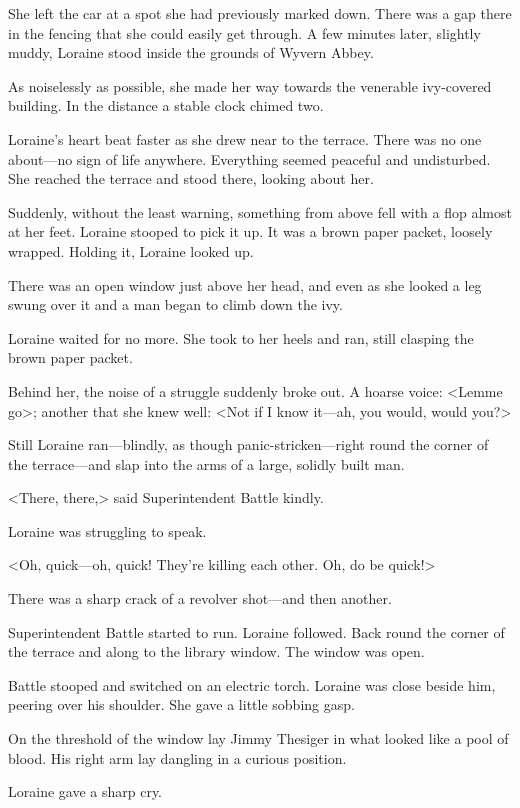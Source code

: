 She left the car at a spot she had previously marked down. There was a gap there in the fencing that she could easily get through. A few minutes later, slightly muddy, Loraine stood inside the grounds of Wyvern Abbey.

As noiselessly as possible, she made her way towards the venerable ivy-covered building. In the distance a stable clock chimed two.

Loraine's heart beat faster as she drew near to the terrace. There was no one about—no sign of life anywhere. Everything seemed peaceful and undisturbed. She reached the terrace and stood there, looking about her.

Suddenly, without the least warning, something from above fell with a flop almost at her feet. Loraine stooped to pick it up. It was a brown paper packet, loosely wrapped. Holding it, Loraine looked up.

There was an open window just above her head, and even as she looked a leg swung over it and a man began to climb down the ivy.

Loraine waited for no more. She took to her heels and ran, still clasping the brown paper packet.

Behind her, the noise of a struggle suddenly broke out. A hoarse voice: <Lemme go>; another that she knew well: <Not if I know it—ah, you would, would you?>

Still Loraine ran—blindly, as though panic-stricken—right round the corner of the terrace—and slap into the arms of a large, solidly built man.

<There, there,> said Superintendent Battle kindly.

Loraine was struggling to speak.

<Oh, quick—oh, quick! They're killing each other. Oh, do be quick!>

There was a sharp crack of a revolver shot—and then another.

Superintendent Battle started to run. Loraine followed. Back round the corner of the terrace and along to the library window. The window was open.

Battle stooped and switched on an electric torch. Loraine was close beside him, peering over his shoulder. She gave a little sobbing gasp.

On the threshold of the window lay Jimmy Thesiger in what looked like a pool of blood. His right arm lay dangling in a curious position.

Loraine gave a sharp cry.


